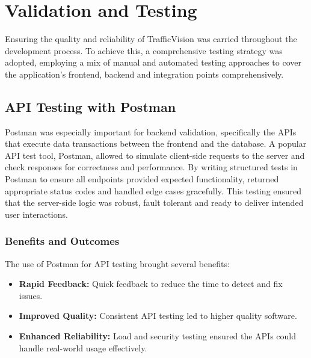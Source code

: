 \section{Validation and Testing}

Ensuring the quality and reliability of TrafficVision was carried throughout the development process. To achieve this, a comprehensive testing strategy was adopted, employing a mix of manual and automated testing approaches to cover the application's frontend, backend and integration points comprehensively.

\subsection{API Testing with Postman}

Postman\cite{postman2021} was especially important for backend validation, specifically the APIs that execute data transactions between the frontend and the database. A popular API test tool, Postman, allowed to simulate client-side requests to the server and check responses for correctness and performance. By writing structured tests in Postman to ensure all endpoints provided expected functionality, returned appropriate status codes and handled edge cases gracefully. This testing ensured that the server-side logic was robust, fault tolerant and ready to deliver intended user interactions.

\subsubsection{Benefits and Outcomes}
The use of Postman for API testing brought several benefits:
\begin{itemize}
    \item \textbf{Rapid Feedback:} Quick feedback to reduce the time to detect and fix issues.
    \item \textbf{Improved Quality:} Consistent API testing led to higher quality software.
    \item \textbf{Enhanced Reliability:} Load and security testing ensured the APIs could handle real-world usage effectively.
\end{itemize}

